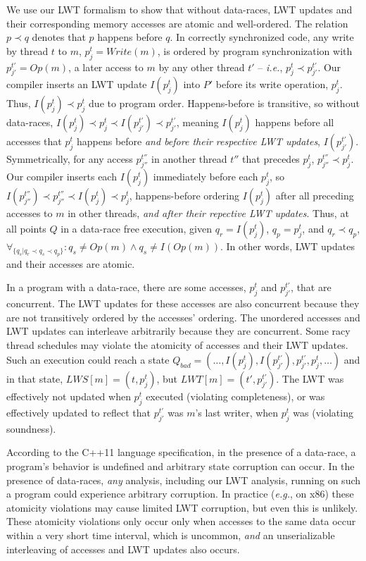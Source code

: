 \documentclass[preprint,9pt]{sigplanconf}
\newcommand{\lwt}{LWT\xspace}
\begin{document}
We use our \lwt formalism to show that without data-races, \lwt updates and
their corresponding memory accesses are atomic and well-ordered.  The relation
$p \prec q$ denotes that $p$ happens before $q$.  In correctly synchronized
code, any write by thread $t$ to $m$, $p^{t}_{j} = Write(m)$, is ordered by
program synchronization with $p^{t'}_{j'} = Op(m)$, a later access to $m$ by
any other thread $t'$ -- {\em i.e.}, $p^{t}_{j} \prec p^{t'}_{j'}$.  Our
compiler inserts an \lwt update $I(p^{t}_{j})$ into $P'$ before its write
operation, $p^{t}_{j}$. Thus, $I(p^{t}_{j}) \prec p^{t}_{j}$ due to program
order.  Happens-before is transitive, so without data-races, $I(p^{t}_{j})
\prec p^{t}_{j} \prec I(p^{t'}_{j'}) \prec p^{t'}_{j'}$, meaning $I(p^{t}_{j})$
happens before all accesses that $p^{t}_{j}$ happens before {\em and before
their respective \lwt updates}, $I(p^{t'}_{j'})$.  Symmetrically, for any
access $p^{t''}_{j''}$ in another thread $t''$ that precedes $p^{t}_{j}$,
$p^{t''}_{j''} \prec p^{t}_{j}$.  Our compiler inserts each $I(p^{t}_{j})$
immediately before each $p^{t}_{j}$, so $I(p^{t''}_{j''}) \prec p^{t''}_{j''}
\prec I(p^{t}_{j}) \prec p^{t}_{j}$, happens-before ordering $I(p^{t}_{j})$
after all preceding accesses to $m$ in other threads, {\em and after their
repective \lwt updates}.  Thus, at all points $Q$ in a data-race free
execution, given $q_r = I(p^{t}_{j})$, $q_p = p^{t}_{j}$, and $q_r \prec q_p$,
$\forall_{ \{q_s | q_r \prec q_s \prec q_p \}}: q_s \ne Op(m) \wedge q_s \ne
I(Op(m)) $.  In other words, \lwt updates and their accesses are atomic.

In a program with a data-race, there are some accesses, $p^{t}_{j}$ and
$p^{t'}_{j'}$, that are concurrent.  The \lwt updates for these accesses are
also concurrent because they are not transitively ordered by the accesses' ordering.  The unordered accesses and \lwt updates can interleave arbitrarily
because they are concurrent.  Some racy thread schedules may violate the
atomicity of accesses and their \lwt updates.  Such an execution could reach a
state $Q_{bad} = (\ldots, I(p^{t}_{j}), I(p^{t'}_{j'}), p^{t'}_{j'}, p^{t}_{j},
\ldots)$ and in that state, $LWS[m] = (t,p^{t}_{j})$, but $LWT[m] =
(t',p^{t'}_{j'})$.  The \lwt was effectively not updated when $p^{t}_{j}$
executed (violating completeness), or was effectively updated to reflect that
$p^{t'}_{j'}$ was $m$'s last writer, when $p^{t}_{j}$ was (violating
soundness).    

According to the C++11 language specification, in the presence of a data-race,
a program's behavior is undefined and arbitrary state corruption can occur.  In
the presence of data-races, {\em any} analysis, including our \lwt analysis,
running on such a program could experience arbitrary corruption.  In practice
({\em e.g.}, on x86) these atomicity violations may cause limited \lwt
corruption, but even this is unlikely.  These atomicity violations only occur
only when accesses to the same data occur within a very short time interval,
which is uncommon, {\em and} an unserializable interleaving of accesses and
\lwt updates also occurs.
\end{document}
